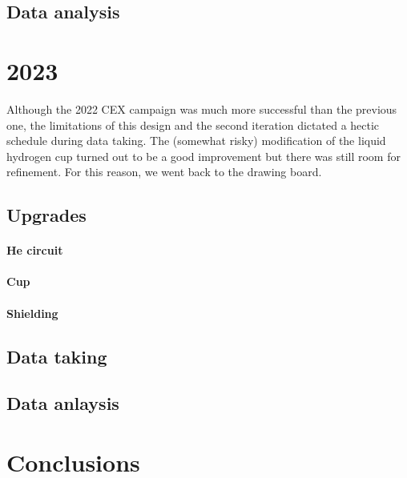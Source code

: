 \begin{refsection}
\subsection{Data analysis}

\section{2023}
Although the 2022 CEX campaign was much more successful than the previous one, the limitations of this design and the second iteration dictated a hectic schedule during data taking. 
The (somewhat risky) modification of the liquid hydrogen cup turned out to be a good improvement but there was still room for refinement. 
For this reason, we went back to the drawing board.

\subsection{Upgrades}
\paragraph{He circuit}
\paragraph{Cup}
\paragraph{Shielding}
\subsection{Data taking}
\subsection{Data anlaysis}

\section{Conclusions}

\printbibliography[title=Bibliography on \ce{LH2}]
\end{refsection}
